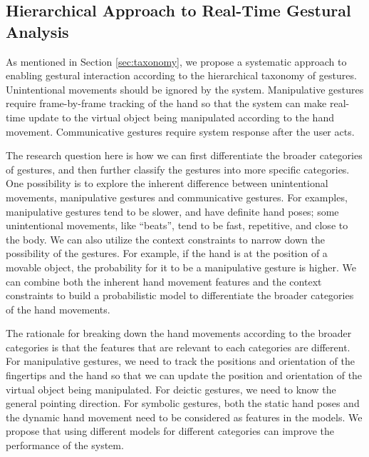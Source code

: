 \subsection{Hierarchical Approach to Real-Time Gestural Analysis}
As mentioned in Section \ref{sec:taxonomy}, we propose a systematic approach to
enabling gestural interaction according to the hierarchical taxonomy of
gestures. Unintentional movements should be ignored by the system.
Manipulative gestures require frame-by-frame tracking of the hand so that the
system can make real-time update to the virtual object being manipulated according to the hand
movement. Communicative gestures require system response after the user acts.

The research question here is how we can first differentiate the broader
categories of gestures, and then further classify the gestures into more 
specific categories. One possibility is to explore the inherent difference
between unintentional movements, manipulative gestures and communicative
gestures. For examples, manipulative gestures tend to be
slower, and have definite hand poses; some unintentional movements, like
``beats'', tend to be fast, repetitive, and close to the body. We can also
utilize the context constraints to narrow down the possibility of the gestures. For example, if the hand is at the position of a movable object, the probability
for it to be a manipulative gesture is higher. We can combine both the inherent
hand movement features and the context constraints to build a probabilistic
model to differentiate the broader categories of the hand movements.

The rationale for breaking down the hand movements according to the broader
categories is that the features that are relevant to each categories are
different. For manipulative gestures, we need to track the positions and 
orientation of the fingertips and the hand so that we can update the position 
and orientation of the virtual object being manipulated. For deictic gestures, 
we need to know the general pointing direction. For symbolic gestures, both the 
static hand poses and the dynamic hand movement need to be considered as 
features in the models. We propose that using different models for
different categories can improve the performance of the system. 

